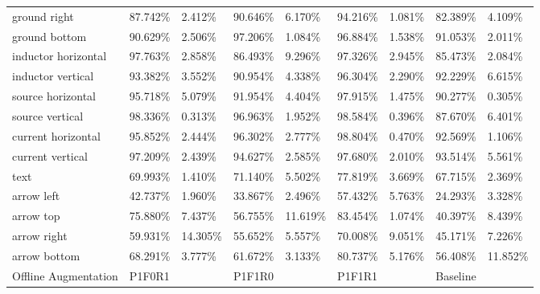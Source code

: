 \begin{table}[H]
\begin{center}
\begin{tabular}{|l|l|l|l|l|l|l|l|l|}
\rowcolor{lightgray!50}
ground right                    & 87.742\% & 2.412\%  & 90.646\% & 6.170\%  & 94.216\% & 1.081\% & 82.389\% & 4.109\%    \\
ground bottom                   & 90.629\% & 2.506\%  & 97.206\% & 1.084\%  & 96.884\% & 1.538\% & 91.053\% & 2.011\%    \\
\rowcolor{lightgray!50}
inductor horizontal             & 97.763\% & 2.858\%  & 86.493\% & 9.296\%  & 97.326\% & 2.945\% & 85.473\% & 2.084\%    \\
inductor vertical               & 93.382\% & 3.552\%  & 90.954\% & 4.338\%  & 96.304\% & 2.290\% & 92.229\% & 6.615\%    \\
\rowcolor{lightgray!50}
source horizontal               & 95.718\% & 5.079\%  & 91.954\% & 4.404\%  & 97.915\% & 1.475\% & 90.277\% & 0.305\%    \\
source vertical                 & 98.336\% & 0.313\%  & 96.963\% & 1.952\%  & 98.584\% & 0.396\% & 87.670\% & 6.401\%    \\
\rowcolor{lightgray!50}
current horizontal              & 95.852\% & 2.444\%  & 96.302\% & 2.777\%  & 98.804\% & 0.470\% & 92.569\% & 1.106\%    \\
current vertical                & 97.209\% & 2.439\%  & 94.627\% & 2.585\%  & 97.680\% & 2.010\% & 93.514\% & 5.561\%    \\
\rowcolor{lightgray!50}
text                            & 69.993\% & 1.410\%  & 71.140\% & 5.502\%  & 77.819\% & 3.669\% & 67.715\% & 2.369\%    \\
arrow left                      & 42.737\% & 1.960\%  & 33.867\% & 2.496\%  & 57.432\% & 5.763\% & 24.293\% & 3.328\%    \\
\rowcolor{lightgray!50}
arrow top                       & 75.880\% & 7.437\%  & 56.755\% & 11.619\% & 83.454\% & 1.074\% & 40.397\% & 8.439\%    \\
arrow right                     & 59.931\% & 14.305\% & 55.652\% & 5.557\%  & 70.008\% & 9.051\% & 45.171\% & 7.226\%    \\
\rowcolor{lightgray!50}
arrow bottom                    & 68.291\% & 3.777\%  & 61.672\% & 3.133\%  & 80.737\% & 5.176\% & 56.408\% & 11.852\%   \\
\hline
\hline
Offline Augmentation            & P1F0R1   &          & P1F1R0   &          & \cellcolor{green}P1F1R1   &           & Baseline &          \\

\end{tabular}
\end{center}
\end{table}
